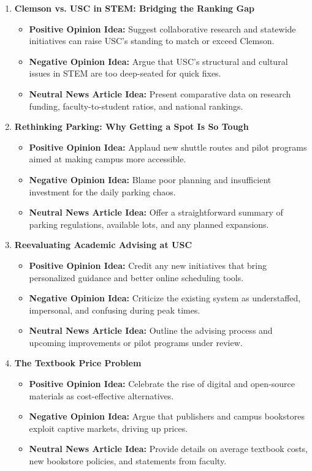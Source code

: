 \documentclass{article}
\begin{document}
\begin{enumerate}
    \item \textbf{Clemson vs. USC in STEM: Bridging the Ranking Gap}
    \begin{itemize}
        \item \textbf{Positive Opinion Idea:} Suggest collaborative research and statewide initiatives can raise USC’s standing to match or exceed Clemson.
        \item \textbf{Negative Opinion Idea:} Argue that USC’s structural and cultural issues in STEM are too deep-seated for quick fixes.
        \item \textbf{Neutral News Article Idea:} Present comparative data on research funding, faculty-to-student ratios, and national rankings.
    \end{itemize}

    \item \textbf{Rethinking Parking: Why Getting a Spot Is So Tough}
    \begin{itemize}
        \item \textbf{Positive Opinion Idea:} Applaud new shuttle routes and pilot programs aimed at making campus more accessible.
        \item \textbf{Negative Opinion Idea:} Blame poor planning and insufficient investment for the daily parking chaos.
        \item \textbf{Neutral News Article Idea:} Offer a straightforward summary of parking regulations, available lots, and any planned expansions.
    \end{itemize}

    \item \textbf{Reevaluating Academic Advising at USC}
    \begin{itemize}
        \item \textbf{Positive Opinion Idea:} Credit any new initiatives that bring personalized guidance and better online scheduling tools.
        \item \textbf{Negative Opinion Idea:} Criticize the existing system as understaffed, impersonal, and confusing during peak times.
        \item \textbf{Neutral News Article Idea:} Outline the advising process and upcoming improvements or pilot programs under review.
    \end{itemize}

    \item \textbf{The Textbook Price Problem}
    \begin{itemize}
        \item \textbf{Positive Opinion Idea:} Celebrate the rise of digital and open-source materials as cost-effective alternatives.
        \item \textbf{Negative Opinion Idea:} Argue that publishers and campus bookstores exploit captive markets, driving up prices.
        \item \textbf{Neutral News Article Idea:} Provide details on average textbook costs, new bookstore policies, and statements from faculty.
    \end{itemize}


\end{enumerate}
\end{document}
